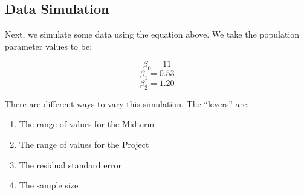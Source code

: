 \documentclass[
]{article}
\newenvironment{Shaded}{\begin{snugshade}}{\end{snugshade}}
\newcommand{\AttributeTok}[1]{\textcolor[rgb]{0.77,0.63,0.00}{#1}}
\newcommand{\ControlFlowTok}[1]{\textcolor[rgb]{0.13,0.29,0.53}{\textbf{#1}}}
\newcommand{\DecValTok}[1]{\textcolor[rgb]{0.00,0.00,0.81}{#1}}
\newcommand{\FloatTok}[1]{\textcolor[rgb]{0.00,0.00,0.81}{#1}}
\newcommand{\FunctionTok}[1]{\textcolor[rgb]{0.00,0.00,0.00}{#1}}
\newcommand{\NormalTok}[1]{#1}
\newcommand{\OtherTok}[1]{\textcolor[rgb]{0.56,0.35,0.01}{#1}}
\newcommand{\SpecialCharTok}[1]{\textcolor[rgb]{0.00,0.00,0.00}{#1}}
\providecommand{\tightlist}{%
  \setlength{\itemsep}{0pt}\setlength{\parskip}{0pt}}
\begin{document}
\begin{Shaded}
\end{Shaded}

\hypertarget{data-simulation}{%
\subsection{Data Simulation}\label{data-simulation}}

Next, we simulate some data using the equation above. We take the
population parameter values to be:

\[\beta_0=11\] \[\beta_1=0.53\] \[\beta_2=1.20\]

There are different ways to vary this simulation. The ``levers'' are:

\begin{enumerate}
\def\labelenumi{\arabic{enumi}.}
\tightlist
\item
  The range of values for the Midterm
\item
  The range of values for the Project
\item
  The residual standard error
\item
  The sample size
\end{enumerate}
\end{document}
